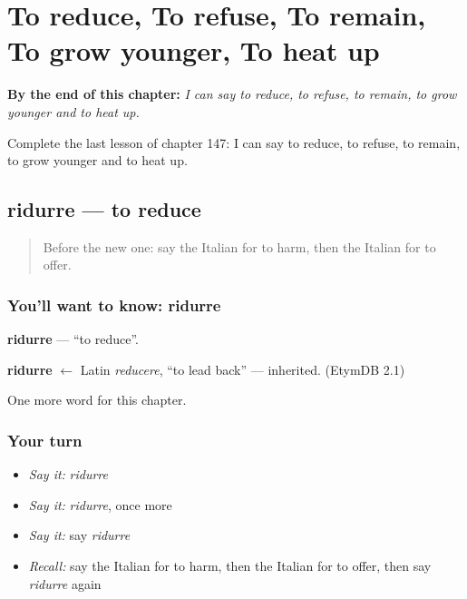 
\chapter{To reduce, To refuse, To remain, To grow younger, To heat up}
\label{ch:it-to-reduce-to-refuse-to-remain-to-grow-younger-to-heat-up}

\begin{chapteropening}
\textbf{By the end of this chapter:} \emph{I can say to reduce, to refuse, to remain, to grow younger and to heat up.}

Complete the last lesson of chapter 147: I can say to reduce, to refuse, to remain, to grow younger and to heat up.
\end{chapteropening}

\section[ridurre]{ridurre — to reduce}

\label{lesson:IT-C147-ridurre}



\begin{quote}
Before the new one: say the Italian for to harm, then the Italian for to offer.
\end{quote}

\subsection*{You'll want to know: ridurre}
\textbf{ridurre} — \textquotedblleft{}to reduce\textquotedblright{}.

\begin{cousinweb}
\textbf{ridurre} $\leftarrow$ Latin \emph{reducere}, \textquotedblleft{}to lead back\textquotedblright{} — inherited. (EtymDB 2.1)
\end{cousinweb}

\begin{grammarlens}[title={What you've built}]
One more word for this chapter.
\end{grammarlens}

\subsection*{Your turn}
\begin{itemize}
\raggedright
  \item \emph{Say it:} \emph{ridurre}
  \item \emph{Say it:} \emph{ridurre}, once more
  \item \emph{Say it:} say \emph{ridurre}
  \item \emph{Recall:} say the Italian for to harm, then the Italian for to offer, then say \emph{ridurre} again
\end{itemize}

